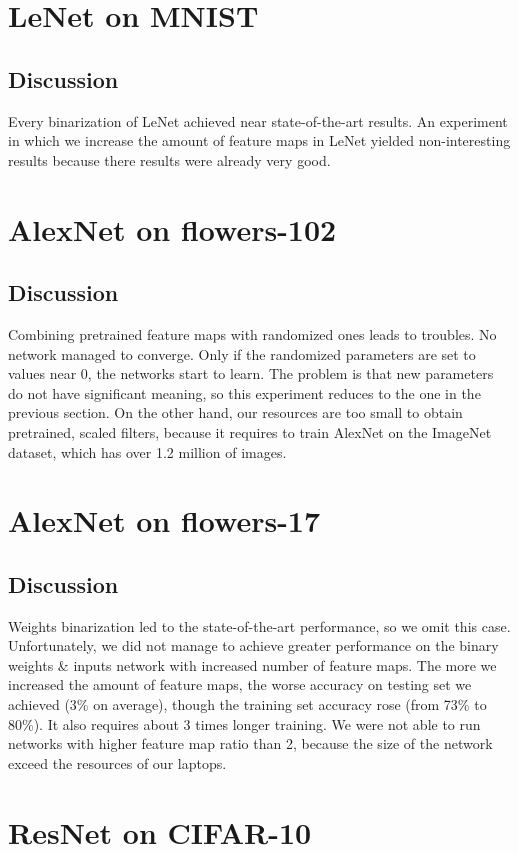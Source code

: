 \documentclass[licencjacka]{pracamgr}
\begin{document}
	\section{LeNet on MNIST}
	\subsection{Discussion}
	Every binarization of LeNet achieved near state-of-the-art results. An experiment in which we increase the amount of feature maps in LeNet yielded non-interesting results because there results were already very good.
	\section{AlexNet on flowers-102}
	\subsection{Discussion}
	Combining pretrained feature maps with randomized ones leads to troubles. No network managed to converge. Only if the randomized parameters are set to values near 0, the networks start to learn. The problem is that new parameters do not have significant meaning, so this experiment reduces to the one in the previous section. On the other hand, our resources are too small to obtain pretrained, scaled filters, because it requires to train AlexNet on the ImageNet dataset, which has over 1.2 million of images.
	\section{AlexNet on flowers-17}
	\subsection{Discussion}
	Weights binarization led to the state-of-the-art performance, so we omit this case. Unfortunately, we did not manage to achieve greater performance on the binary weights \& inputs network with increased number of feature maps. The more we increased the amount of feature maps, the worse accuracy on testing set we achieved (3\% on average), though the training set accuracy rose (from 73\% to 80\%). It also requires about 3 times longer training.  We were not able to run networks with higher feature map ratio than 2, because the size of the network exceed the resources of our laptops.
	\section{ResNet on CIFAR-10}
\end{document}
